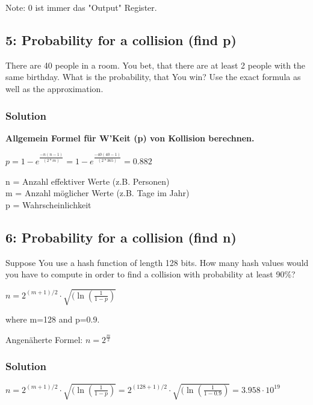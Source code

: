 \documentclass[11pt]{article}
\begin{document}
Note: 0 ist immer das "Output" Register. 

\newpage

    \hypertarget{probability-for-a-collision-find-p}{%
\subsection{5: Probability for a collision (find
p)}\label{probability-for-a-collision-find-p}}

There are 40 people in a room. You bet, that there are at least 2 people
with the same birthday. What is the probability, that You win? Use the
exact formula as well as the approximation.

\hypertarget{solution}{%
\subsubsection{Solution}\label{solution}}

\textbf{Allgemein Formel für W'Keit (p) von Kollision berechnen.}

\(p = 1 - e^{\frac{-n(n-1)}{(2*m)}} = 1 - e^{\frac{-40(40-1)}{(2*365)}} = 0.882\)

n = Anzahl effektiver Werte (z.B. Personen)\\
m = Anzahl möglicher Werte (z.B. Tage im Jahr)\\
p = Wahrscheinlichkeit

    \hypertarget{probability-for-a-collision-find-n}{%
\subsection{6: Probability for a collision (find
n)}\label{probability-for-a-collision-find-n}}

Suppose You use a hash function of length 128 bits. How many hash values
would you have to compute in order to find a collision with probability
at least 90\%?

\(n = 2^{(m+1)/2} \cdot \sqrt{(\ln{(\frac{1}{1-p})}}\)

where m=128 and p=0.9.

Angenäherte Formel: \(n = 2^{\frac{m}{2}}\)

\hypertarget{solution}{%
\subsubsection{Solution}\label{solution}}

\(n = 2^{(m+1)/2} \cdot \sqrt{(\ln{(\frac{1}{1-p})}} = 2^{(128+1)/2} \cdot \sqrt{(\ln{(\frac{1}{1-0.9})}} = 3.958 \cdot 10^{19}\)
\end{document}
